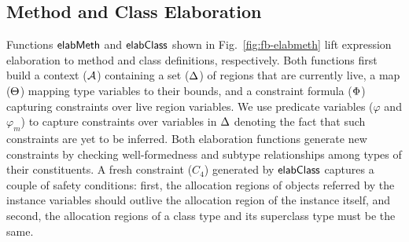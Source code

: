 
\subsection{Method and Class Elaboration}

Functions ${\sf elabMeth}$ and ${\sf elabClass}$ shown in
Fig.~\ref{fig:fb-elabmeth} lift expression elaboration to method and
class definitions, respectively. Both functions first build a context
(${\mathcal{A}}$) containing a set ($ \Delta$) of regions that are currently
live, a map ($\Theta$) mapping type variables to their bounds, and a
constraint formula ($\Phi$) capturing constraints over live region
variables. We use predicate variables ($\varphi$ and $\varphi_m$) to
capture constraints over variables in $\Delta$ denoting the fact that
such constraints are yet to be inferred. Both elaboration functions
generate new constraints by checking well-formedness and subtype
relationships among types of their constituents. A fresh constraint
($C_4$) generated by ${\sf elabClass}$ captures a couple of safety
conditions: first, the allocation regions of objects referred by the
instance variables should outlive the allocation region of the
instance itself, and second, the allocation regions of a class type
and its superclass type must be the same.


